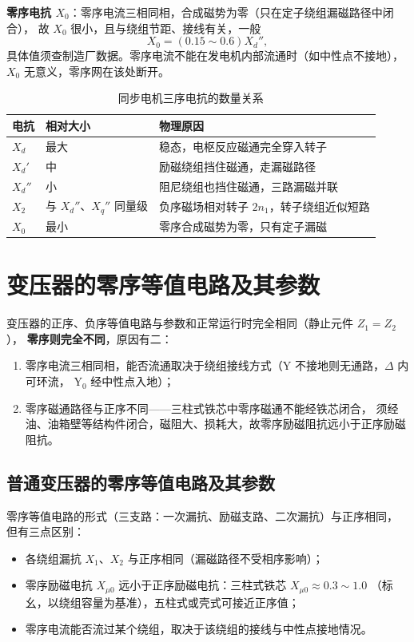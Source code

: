 \textbf{零序电抗 $X_0$}：零序电流三相同相，合成磁势为零（只在定子绕组漏磁路径中闭合），
故 $X_0$ 很小，且与绕组节距、接线有关，一般
\begin{equation}
  X_0=(0.15\sim0.6)X_d'' ,
\end{equation}
具体值须查制造厂数据。零序电流不能在发电机内部流通时（如中性点不接地），
$X_0$ 无意义，零序网在该处断开。

\begin{table}[htbp]
  \centering
  \caption{同步电机三序电抗的数量关系}
  \small
  \begin{tabular}{@{}lll@{}}
    \toprule
    电抗 & 相对大小 & 物理原因 \\
    \midrule
    $X_d$ & 最大 & 稳态，电枢反应磁通完全穿入转子 \\
    $X_d'$ & 中 & 励磁绕组挡住磁通，走漏磁路径 \\
    $X_d''$ & 小 & 阻尼绕组也挡住磁通，三路漏磁并联 \\
    $X_2$ & 与 $X_d''$、$X_q''$ 同量级 & 负序磁场相对转子 $2n_1$，转子绕组近似短路 \\
    $X_0$ & 最小 & 零序合成磁势为零，只有定子漏磁 \\
    \bottomrule
  \end{tabular}
\end{table}

\section{变压器的零序等值电路及其参数}

变压器的正序、负序等值电路与参数和正常运行时完全相同（静止元件 $Z_1=Z_2$），
\textbf{零序则完全不同}，原因有二：
\begin{enumerate}
  \item 零序电流三相同相，能否流通取决于绕组接线方式（Y 不接地则无通路，$\Delta$ 内可环流，
        Y$_0$ 经中性点入地）；
  \item 零序磁通路径与正序不同——三柱式铁芯中零序磁通不能经铁芯闭合，
        须经油、油箱壁等结构件闭合，磁阻大、损耗大，故零序励磁阻抗远小于正序励磁阻抗。
\end{enumerate}

\subsection{普通变压器的零序等值电路及其参数}

零序等值电路的形式（三支路：一次漏抗、励磁支路、二次漏抗）与正序相同，
但有三点区别：
\begin{itemize}
  \item 各绕组漏抗 $X_1$、$X_2$ 与正序相同（漏磁路径不受相序影响）；
  \item 零序励磁电抗 $X_{\mu0}$ 远小于正序励磁电抗：三柱式铁芯 $X_{\mu0}\approx0.3\sim1.0$
        （标幺，以绕组容量为基准），五柱式或壳式可接近正序值；
  \item 零序电流能否流过某个绕组，取决于该绕组的接线与中性点接地情况。
\end{itemize}

